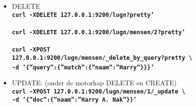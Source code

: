 \subsection{}
\begin{styleframefrag}
	\frametitle{}
\begin{itemize}[<+>]
	\item DELETE\\
{\scriptsize {\tt \textbf{\hspace{1em}curl -XDELETE 127.0.0.1:9200/lugn?pretty'}}}\\
~\\
{\scriptsize {\tt \textbf{\hspace{1em}curl -XDELETE 127.0.0.1:9200/lugn/mensen/2?pretty'}}}\\
~\\
{\scriptsize {\tt \textbf{\hspace{1em}curl -XPOST}}}\\
{\scriptsize {\tt \textbf{\hspace{2em}127.0.0.1:9200/lugn/mensen/\_delete\_by\_query?pretty \textbackslash}}}\\
{\scriptsize {\tt \textbf{\hspace{2em}-d '\{''query'':\{''match'':\{''naam'':''Harry''\}\}\}'}}}
~\\
	\item UPDATE: (onder de motorkap DELETE en CREATE)\\
{\scriptsize {\tt \textbf{\hspace{1em}curl -XPOST 127.0.0.1:9200/lugn/mensen/1/\_update \textbackslash}}}\\
{\scriptsize {\tt \textbf{\hspace{2em}-d '\{''doc'':\{''naam'':''Harry A. Nak''\}\}'}}}
\end{itemize}
\end{styleframefrag}

